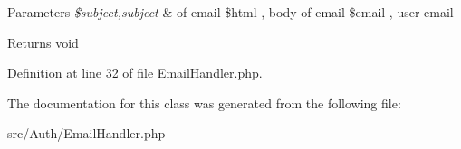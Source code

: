 \begin{DoxyParams}{Parameters}
{\em \$subject,subject} & of email \$html , body of email \$email , user email\\
\hline
\end{DoxyParams}
\begin{DoxyReturn}{Returns}
void 
\end{DoxyReturn}


Definition at line 32 of file Email\+Handler.\+php.



The documentation for this class was generated from the following file\+:\begin{DoxyCompactItemize}
\item 
src/\+Auth/Email\+Handler.\+php\end{DoxyCompactItemize}
